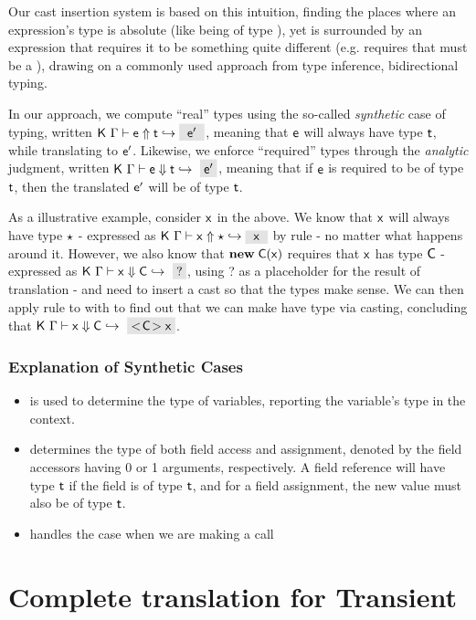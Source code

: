 \documentclass[acmlarge, anonymous, authordraft]{acmart}
\begin{document}
Our cast insertion system is based on this intuition, finding the places where an expression's type is absolute (like \x being 
of type \any), yet is surrounded by an expression that requires it to be something quite different (e.g. \New\C\x requires that
\x must be a \C), drawing on a commonly used approach from type inference, bidirectional typing.

In our approach, we compute ``real'' types using the so-called \emph{synthetic} case of typing, written $\GenCast\K\Env\e\ep\t$,
meaning that ${\sf{e}}$ will always have type $\t$, while translating to ${{{\sf{e'}}}}$. Likewise, we enforce ``required'' types through the 
\emph{analytic} judgment, written $\AnaCast\K\Env\e\ep\t$, meaning that if ${\sf{e}}$ is required to be of type $\t$, then the translated
${{{\sf{e'}}}}$ will be of type $\t$.

As a illustrative example, consider ${\sf{x}}$ in the above. We know that ${\sf{x}}$ will always have type $\star$ - expressed as
$\GenCast\K\Env\x\x\any$ by rule  - no matter what happens around it. However, we also know that ${\sf{\bf new}}\;{\sf{C}}({\sf{x}})$ 
requires that ${\sf{x}}$ has type ${\sf{C}}$ - expressed as $\AnaCast\K\Env\x?\C$, using ? as a placeholder for the result of translation
- and need to insert a cast so that the types make sense. We can then apply rule  to \x with \C to find out
that we can make \x have type \C via casting, concluding that $\AnaCast\K\Env\x{\SubCast\C\x}\C$.


\subsubsection{Explanation of Synthetic Cases}
\begin{itemize}
  \item {} is used to determine the type of variables, reporting the variable's type in the context.
  \item {} determines the type of both field access and assignment, denoted by the field accessors having 0 or 1 arguments, respectively. A field reference will have type $\t$ if the field is of type $\t$, and for a field assignment, the new value must also be of type $\t$.
  \item {} handles the case when we are making a call 
\end{itemize}

\section{Complete translation for Transient}
\end{document}
